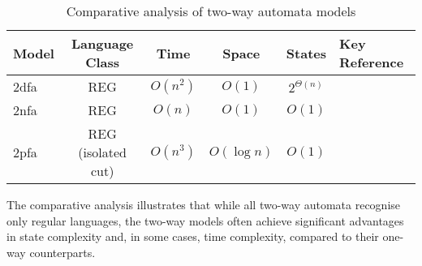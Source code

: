 \begin{table}[ht]
    \label{tab:two-way-comparison}
    \centering
    \begin{tabular}{|l|c|c|c|c|l|}
        \hline
        \textbf{Model} & \textbf{Language Class} & \textbf{Time} & \textbf{Space} & \textbf{States} & \textbf{Key Reference} \\ 
        \hline
        \gls{2dfa}  & REG & \(O(n^2)\) & \(O(1)\) & \(2^{\Theta(n)}\) & \cite{shepherdson1959reduction} \\
        \gls{2nfa}  & REG & \(O(n)\) & \(O(1)\) & \(O(1)\) & \cite{sakoda1978nfas} \\
        \gls{2pfa}  & REG (isolated cut) & \(O(n^3)\) & \(O(\log n)\) & \(O(1)\) & \cite{dwork1990time} \\
        \hline
    \end{tabular}
    \caption{Comparative analysis of two-way automata models}
\end{table}

\begin{remark}
The comparative analysis illustrates that while all two-way automata recognise only regular languages, the two-way models often achieve significant advantages in state complexity and, in some cases, time complexity, compared to their one-way counterparts.
\end{remark} 
